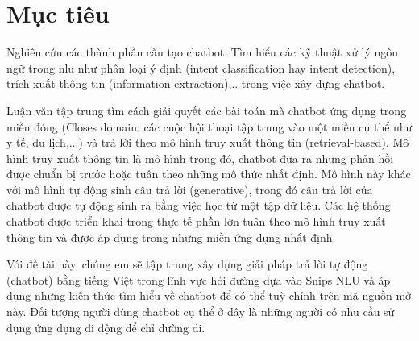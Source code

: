 \section{Mục tiêu}

Nghiên cứu các thành phần cấu tạo chatbot. Tìm hiểu các kỹ thuật xử lý ngôn ngữ trong \ac{nlu} như phân loại ý định (intent classification hay intent detection), trích xuất thông tin (information extraction),.. trong việc xây dựng chatbot.

Luận văn tập trung tìm cách giải quyết các bài toán mà chatbot ứng dụng trong miền đóng (Closes domain: các cuộc hội thoại tập trung vào một miền cụ thể như y tế, du lịch,...) và trả lời theo mô hình truy xuất thông tin (retrieval-based). Mô hình truy xuất thông tin là mô hình trong đó, chatbot đưa ra những phản hồi được chuẩn bị trước hoặc tuân theo những mô thức nhất định. Mô hình này khác với mô hình tự động sinh câu trả lời (generative), trong đó câu trả lời của chatbot được tự động sinh ra bằng việc học từ một tập dữ liệu. Các hệ thống chatbot được triển khai trong thực tế phần lớn tuân theo mô hình truy xuất thông tin và được áp dụng trong những miền ứng dụng nhất định.

Với đề tài này, chúng em sẽ tập trung xây dựng giải pháp trả lời tự động (chatbot) bằng tiếng Việt trong lĩnh vực hỏi đường dựa vào Snips NLU và áp dụng những kiến thức tìm hiểu về chatbot để có thể tuỳ chỉnh trên mã nguồn mở này. Đối tượng người dùng chatbot cụ thể ở đây là những người có nhu cầu sử dụng ứng dụng di động để chỉ đường đi.

